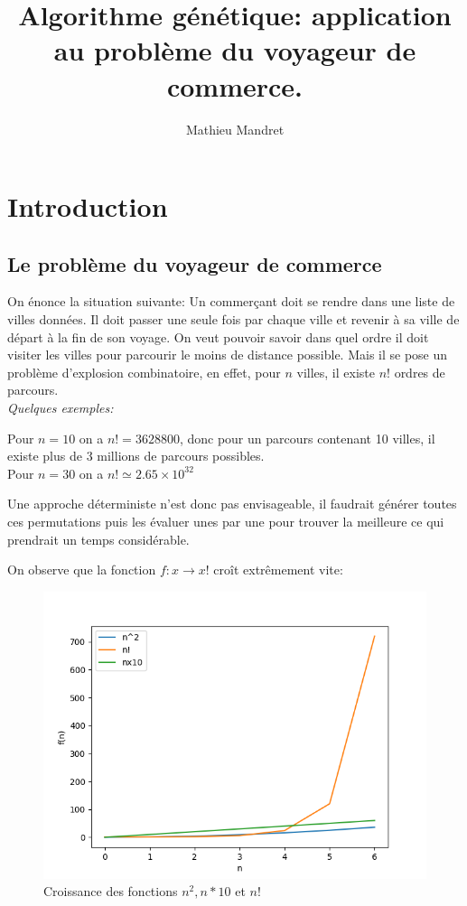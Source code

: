 \documentclass[11pt]{article}
\author{Mathieu Mandret}
\date{}
\title{Algorithme génétique: application au problème du voyageur de commerce.}
\begin{document}
\maketitle
\tableofcontents


\section{Introduction}
\label{sec-1}
\subsection{Le problème du voyageur de commerce}
\label{sec-1-1}
On énonce la situation suivante:
Un commerçant doit se rendre dans une liste de villes données. Il doit passer une seule fois par chaque ville
et revenir à sa ville de départ à la fin de son voyage.
On veut pouvoir savoir dans quel ordre il doit visiter les villes pour parcourir le moins de distance possible.
Mais il se pose un problème d'explosion combinatoire, en effet, pour $n$ villes, il existe $n!$ ordres de parcours. \\
\emph{Quelques exemples:} 

Pour $n = 10$ on a $n! = 3628800$, donc pour un parcours contenant 10 villes, il existe plus de 3 millions de parcours possibles. \\

Pour $n = 30$ on a $n! \simeq 2.65 \times 10^{32}$

Une approche déterministe n'est donc pas envisageable, il faudrait générer toutes ces permutations puis les évaluer unes
par une pour trouver la meilleure ce qui prendrait un temps considérable. 

On observe que la fonction $f: x \rightarrow x!$ croît extrêmement vite:

\begin{figure}[htb]
\centering
\includegraphics[width=.9\linewidth]{./complexite.png}
\caption{Croissance des fonctions $n^2, n*10$ et $n!$}
\end{figure}
\end{document}
